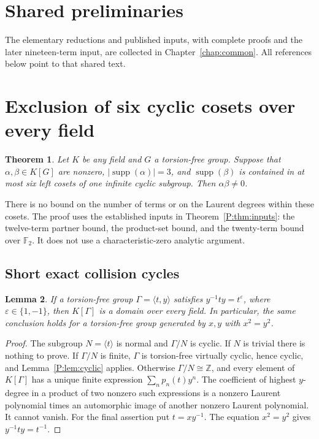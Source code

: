 \documentclass[11pt,a4paper,oneside]{report}
\newtheorem{theorem}{Theorem}[section]
\newtheorem{lemma}[theorem]{Lemma}
\theoremstyle{definition}
\theoremstyle{remark}
\DeclareMathOperator{\supp}{supp}
\newcommand{\Z}{\mathbb Z}
\begin{document}
\section{Shared preliminaries}
The elementary reductions and published inputs, with complete proofs and
the later nineteen-term input, are collected in Chapter~\ref{chap:common}.
All references below point to that shared text.
\section{Exclusion of six cyclic cosets over every field}\label{M11:six:section}

\begin{theorem}\label{M11:six:main}
Let \(K\) be any field and \(G\) a torsion-free group. Suppose that
\(\alpha,\beta\in K[G]\) are nonzero, \(|\supp(\alpha)|=3\), and
\(\supp(\beta)\) is contained in at most six left cosets of one infinite
cyclic subgroup. Then \(\alpha\beta\ne0\).
\end{theorem}

There is no bound on the number of terms or on the Laurent degrees within
these cosets. The proof uses the established inputs in
Theorem~\ref{P:thm:inputs}: the twelve-term partner bound, the product-set
bound, and the twenty-term bound over \(\mathbb F_2\). It does not use a
characteristic-zero analytic argument.

\subsection{Short exact collision cycles}

\begin{lemma}\label{M11:six:cyclic-by-cyclic}
If a torsion-free group \(\Gamma=\langle t,y\rangle\) satisfies
\(y^{-1}ty=t^\varepsilon\), where \(\varepsilon\in\{1,-1\}\), then
\(K[\Gamma]\) is a domain over every field. In particular, the same
conclusion holds for a torsion-free group generated by \(x,y\) with
\(x^2=y^2\).
\end{lemma}

\begin{proof}
The subgroup \(N=\langle t\rangle\) is normal and \(\Gamma/N\) is cyclic.
If \(N\) is trivial there is nothing to prove. If \(\Gamma/N\) is finite,
\(\Gamma\) is torsion-free virtually cyclic, hence cyclic, and
Lemma~\ref{P:lem:cyclic} applies. Otherwise \(\Gamma/N\cong\Z\), and every
element of \(K[\Gamma]\) has a unique finite expression
\(\sum_n p_n(t)y^n\). The coefficient of highest \(y\)-degree in a product
of two nonzero such expressions is a nonzero Laurent polynomial times
an automorphic image of another nonzero Laurent polynomial. It cannot
vanish. For the final assertion put \(t=xy^{-1}\). The equation
\(x^2=y^2\) gives \(y^{-1}ty=t^{-1}\).
\end{proof}
\end{document}
